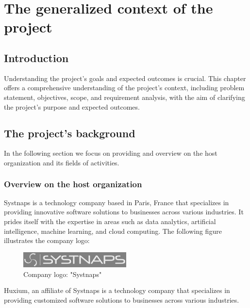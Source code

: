 \graphicspath{{./assets/}}
\setcounter{mtc}{1}
\chapter{The generalized context of the project }


\section*{Introduction}

\hspace{7mm}Understanding the project's goals and expected outcomes is crucial. This chapter offers a comprehensive understanding of the project's context, including problem statement, objectives, scope, and requirement analysis, with the aim of clarifying the project's purpose and expected outcomes.

\section{The project's background}
\hspace{7mm}In the following section we focus on providing and overview on the host organization and its fields of activities. 
\subsection{Overview on the host organization  }

\hspace{7mm}Systnaps is a technology company based in Paris, France that specializes in providing innovative software solutions to businesses across various industries. It prides itself with the expertise in areas such as data analytics, artificial intelligence, machine learning, and cloud computing. The following figure illustrates the company logo: 

\begin{figure}[!ht]\centering
\includegraphics[width=0.5\textwidth,angle=00]{assets/fa.png}
\caption{Company logo: "Systnaps"}
\end{figure}

\hspace{7mm}Huxium, an affiliate of Systnaps is a technology company that specializes in providing customized software solutions to businesses across various industries. 



